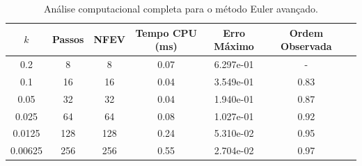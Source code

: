 \begin{table}[H]
    \centering
    \begin{tabular}{ccccccc}
        \hline
        $k$ & Passos & NFEV & Tempo CPU (ms) & Erro Máximo & Ordem Observada \\
        \hline
        0.2 & 8 & 8 & 0.07  & 6.297e-01 & - \\
        0.1 & 16 & 16 & 0.04  & 3.549e-01 & 0.83 \\
        0.05 & 32 & 32 & 0.04  & 1.940e-01 & 0.87 \\
        0.025 & 64 & 64 & 0.08  & 1.027e-01 & 0.92 \\
        0.0125 & 128 & 128 & 0.24  & 5.310e-02 & 0.95 \\
        0.00625 & 256 & 256 & 0.55  & 2.704e-02 & 0.97 \\
        \hline
    \end{tabular}
    \caption{Análise computacional completa para o método Euler avançado.}
    \label{tab:erros_euler_avancado}
\end{table}
